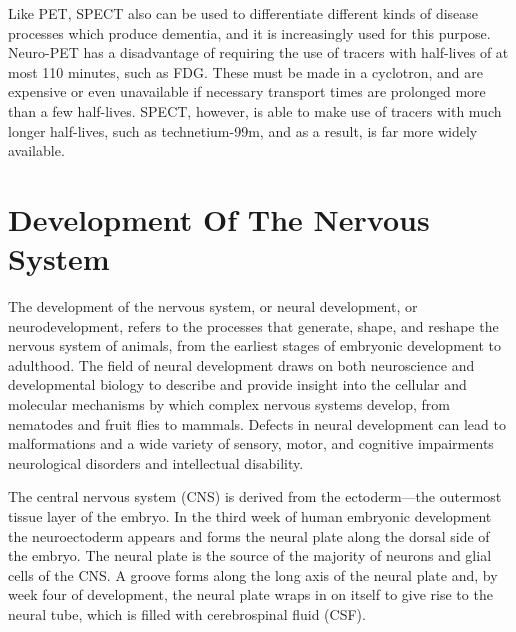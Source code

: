 Like PET, SPECT also can be used to differentiate different kinds of disease processes which produce dementia, and it is increasingly used for this purpose. Neuro-PET has a disadvantage of requiring the use of tracers with half-lives of at most 110 minutes, such as FDG. These must be made in a cyclotron, and are expensive or even unavailable if necessary transport times are prolonged more than a few half-lives. SPECT, however, is able to make use of tracers with much longer half-lives, such as technetium-99m, and as a result, is far more widely available.

\hypertarget{development-of-the-nervous-system-1}{%
\chapter{Development Of The Nervous System}\label{development-of-the-nervous-system-1}}

The development of the nervous system, or neural development, or neurodevelopment, refers to the processes that generate, shape, and reshape the nervous system of animals, from the earliest stages of embryonic development to adulthood. The field of neural development draws on both neuroscience and developmental biology to describe and provide insight into the cellular and molecular mechanisms by which complex nervous systems develop, from nematodes and fruit flies to mammals. Defects in neural development can lead to malformations and a wide variety of sensory, motor, and cognitive impairments neurological disorders and intellectual disability.

The central nervous system (CNS) is derived from the ectoderm---the outermost tissue layer of the embryo. In the third week of human embryonic development the neuroectoderm appears and forms the neural plate along the dorsal side of the embryo. The neural plate is the source of the majority of neurons and glial cells of the CNS. A groove forms along the long axis of the neural plate and, by week four of development, the neural plate wraps in on itself to give rise to the neural tube, which is filled with cerebrospinal fluid (CSF).

